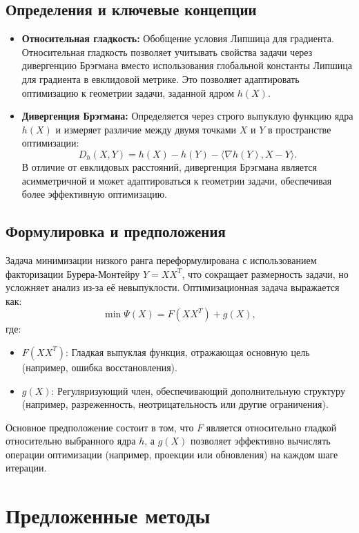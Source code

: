\documentclass[a4paper,11pt]{article}
\begin{document}
\subsection{Определения и ключевые концепции}
\begin{itemize}
    \item \textbf{Относительная гладкость:} Обобщение условия Липшица для градиента. Относительная гладкость позволяет учитывать свойства задачи через дивергенцию Брэгмана вместо использования глобальной константы Липшица для градиента в евклидовой метрике. Это позволяет адаптировать оптимизацию к геометрии задачи, заданной ядром \(h(X)\).
    \item \textbf{Дивергенция Брэгмана:} Определяется через строго выпуклую функцию ядра \(h(X)\) и измеряет различие между двумя точками \(X\) и \(Y\) в пространстве оптимизации:
    \[
    D_h(X, Y) = h(X) - h(Y) - \langle \nabla h(Y), X - Y \rangle.
    \]
    В отличие от евклидовых расстояний, дивергенция Брэгмана является асимметричной и может адаптироваться к геометрии задачи, обеспечивая более эффективную оптимизацию.
\end{itemize}

\subsection{Формулировка и предположения}
Задача минимизации низкого ранга переформулирована с использованием факторизации Бурера-Монтейру \(Y = XX^T\), что сокращает размерность задачи, но усложняет анализ из-за её невыпуклости. Оптимизационная задача выражается как:
\[
\min \Psi(X) = F(XX^T) + g(X),
\]
где:
\begin{itemize}
    \item \(F(XX^T)\): Гладкая выпуклая функция, отражающая основную цель (например, ошибка восстановления).
    \item \(g(X)\): Регуляризующий член, обеспечивающий дополнительную структуру (например, разреженность, неотрицательность или другие ограничения).
\end{itemize}

Основное предположение состоит в том, что \(F\) является относительно гладкой относительно выбранного ядра \(h\), а \(g(X)\) позволяет эффективно вычислять операции оптимизации (например, проекции или обновления) на каждом шаге итерации.

\section{Предложенные методы}
\end{document}

